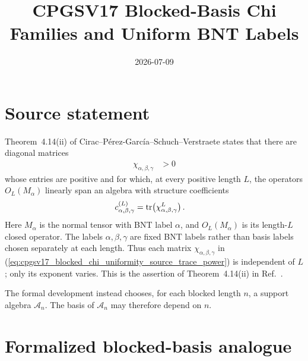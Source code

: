 \documentclass{article}
\title{CPGSV17 Blocked-Basis Chi Families and Uniform BNT Labels}
\author{}
\date{2026-07-09}
\begin{document}
\maketitle
{}

\section{Source statement}

Theorem~4.14(ii) of
Cirac--P\'erez-Garc\'ia--Schuch--Verstraete states that there are diagonal
matrices
\begin{align}
    \chi_{\alpha,\beta,\gamma}
        &> 0
\label{eq:cpgsv17_blocked_chi_uniformity_source_positive_chi}
\end{align}
whose entries are positive and for which, at every positive length $L$, the
operators $O_L(M_\alpha)$ linearly span an algebra with structure
coefficients
\begin{align}
    c^{(L)}_{\alpha,\beta,\gamma}
        &= \operatorname{tr}\!\left(\chi_{\alpha,\beta,\gamma}^{L}\right).
\label{eq:cpgsv17_blocked_chi_uniformity_source_trace_power}
\end{align}
Here $M_\alpha$ is the normal tensor with BNT label $\alpha$, and
$O_L(M_\alpha)$ is its length-$L$ closed operator. The labels
$\alpha,\beta,\gamma$ are fixed BNT labels rather than basis labels chosen
separately at each length. Thus each matrix
$\chi_{\alpha,\beta,\gamma}$ in
(\ref{eq:cpgsv17_blocked_chi_uniformity_source_trace_power}) is independent
of $L$; only its exponent varies. This is the assertion of
Theorem~4.14(ii) in Ref.~\cite{Cirac2016MPDO_arXiv}.

The formal development instead chooses, for each blocked length $n$, a support
algebra $\mathcal A_n$. The basis of $\mathcal A_n$ may therefore depend on
$n$.

\section{Formalized blocked-basis analogue}
\end{document}

